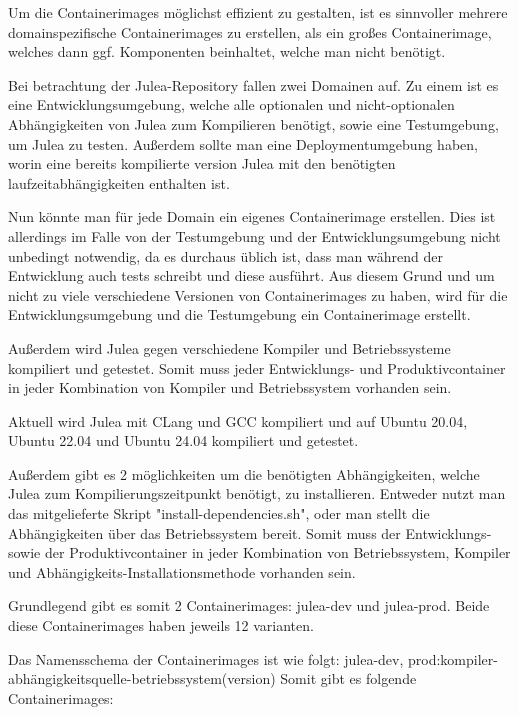 Um die Containerimages möglichst effizient zu gestalten, ist es sinnvoller mehrere domainspezifische Containerimages zu erstellen, als ein großes Containerimage, welches dann ggf. Komponenten beinhaltet, welche man nicht benötigt.

Bei betrachtung der Julea-Repository fallen zwei Domainen auf. Zu einem ist es eine Entwicklungsumgebung, welche alle optionalen und nicht-optionalen Abhängigkeiten von Julea zum Kompilieren benötigt, sowie eine Testumgebung, um Julea zu testen. Außerdem sollte man eine Deploymentumgebung haben, worin eine bereits kompilierte version Julea mit den benötigten laufzeitabhängigkeiten enthalten ist.

Nun könnte man für jede Domain ein eigenes Containerimage erstellen. Dies ist allerdings im Falle von der Testumgebung und der Entwicklungsumgebung nicht unbedingt notwendig, da es durchaus üblich ist, dass man während der Entwicklung auch tests schreibt und diese ausführt. Aus diesem Grund und um nicht zu viele verschiedene Versionen von Containerimages zu haben, wird für die Entwicklungsumgebung und die Testumgebung ein Containerimage erstellt.

Außerdem wird Julea gegen verschiedene Kompiler und Betriebssysteme kompiliert und getestet. Somit muss jeder Entwicklungs- und Produktivcontainer in jeder Kombination von Kompiler und Betriebssystem vorhanden sein. 

Aktuell wird Julea mit CLang und GCC kompiliert und auf Ubuntu 20.04, Ubuntu 22.04 und Ubuntu 24.04 kompiliert und getestet.

Außerdem gibt es 2 möglichkeiten um die benötigten Abhängigkeiten, welche Julea zum Kompilierungszeitpunkt benötigt, zu installieren. Entweder nutzt man das mitgelieferte Skript "install-dependencies.sh", oder man stellt die Abhängigkeiten über das Betriebssystem bereit. Somit muss der Entwicklungs- sowie der Produktivcontainer in jeder Kombination von Betriebssystem, Kompiler und Abhängigkeits-Installationsmethode vorhanden sein.

Grundlegend gibt es somit 2 Containerimages: julea-dev und julea-prod. Beide diese Containerimages haben jeweils 12 varianten.

Das Namensschema der Containerimages ist wie folgt: julea-{dev, prod}:{kompiler}-{abhängigkeitsquelle}-{betriebssystem(version)}
Somit gibt es folgende Containerimages:

